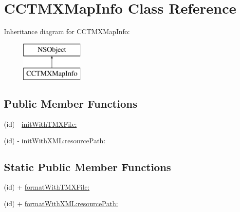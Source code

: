 \hypertarget{interface_c_c_t_m_x_map_info}{\section{C\-C\-T\-M\-X\-Map\-Info Class Reference}
\label{interface_c_c_t_m_x_map_info}
}
Inheritance diagram for C\-C\-T\-M\-X\-Map\-Info\-:\begin{figure}[H]
\begin{center}
\leavevmode
\includegraphics[height=2.000000cm]{interface_c_c_t_m_x_map_info}
\end{center}
\end{figure}
\subsection*{Public Member Functions}
\begin{DoxyCompactItemize}
\item 
(id) -\/ \hyperlink{interface_c_c_t_m_x_map_info_abf5c2eb34a812084e7c7ef2a19f2e49e}{init\-With\-T\-M\-X\-File\-:}
\item 
(id) -\/ \hyperlink{interface_c_c_t_m_x_map_info_a5b653ed1281ede9b7d1ff879ae33bde0}{init\-With\-X\-M\-L\-:resource\-Path\-:}
\end{DoxyCompactItemize}
\subsection*{Static Public Member Functions}
\begin{DoxyCompactItemize}
\item 
(id) + \hyperlink{interface_c_c_t_m_x_map_info_ac760f51bd8ff84e073a171de41675066}{format\-With\-T\-M\-X\-File\-:}
\item 
(id) + \hyperlink{interface_c_c_t_m_x_map_info_aa9b632e0ace2fc883e8e915dcdee34e1}{format\-With\-X\-M\-L\-:resource\-Path\-:}
\end{DoxyCompactItemize}
